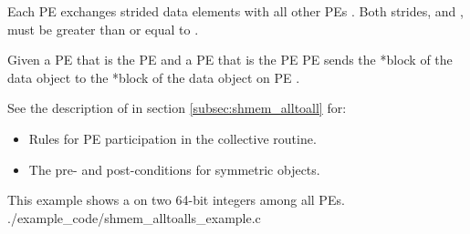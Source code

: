 \begin{apidefinition}
{    Each \ac{PE}  
    exchanges  strided data elements 
    with all other \acp{PE}  .
    Both strides,  and , must be greater
    than or equal to .

    
    Given a \ac{PE}  that is the \kth \ac{PE} 
     and a \ac{PE}
     that is the \lth \ac{PE} 
    \ac{PE}  sends the *\lth block of the  data object to
    the *\kth block of the  data object on
    \ac{PE} .

{\color{Green}
    See the description of  in section
    \ref{subsec:shmem_alltoall} for:
    \begin{itemize}
    \item Rules for \ac{PE} participation in the collective routine.
    \item The pre- and post-conditions for symmetric objects.
    \end{itemize}
}
    
} 




\begin{apiexamples}

\apicexample
    {This \Cstd[11] example shows a  on two 64-bit integers among
    all \acp{PE}.}
    {./example_code/shmem_alltoalls_example.c}
    {}

\end{apiexamples}

\end{apidefinition}
